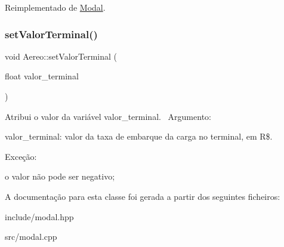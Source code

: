 Reimplementado de \hyperlink{classModal_a20cee7247cce33806d681e1d60347cc5}{Modal}.

\mbox{\label{classAereo_ae2ee9b18fa17516d37250efdb6f617c7}} 
\subsubsection{\texorpdfstring{set\+Valor\+Terminal()}{setValorTerminal()}}
{\footnotesize\ttfamily void Aereo\+::set\+Valor\+Terminal (\begin{DoxyParamCaption}\item[{float}]{valor\+\_\+terminal }\end{DoxyParamCaption})}

Atribui o valor da variável valor\+\_\+terminal.~\newline
 Argumento\+:
\begin{DoxyItemize}
\item valor\+\_\+terminal\+: valor da taxa de embarque da carga no terminal, em R\$.~\newline

\end{DoxyItemize}

Exceção\+:
\begin{DoxyItemize}
\item o valor não pode ser negativo;
\end{DoxyItemize}

A documentação para esta classe foi gerada a partir dos seguintes ficheiros\+:\begin{DoxyCompactItemize}
\item 
include/modal.\+hpp\item 
src/modal.\+cpp\end{DoxyCompactItemize}
